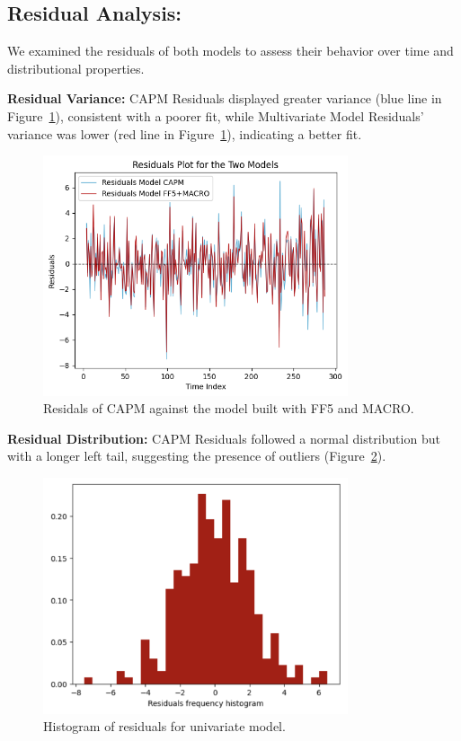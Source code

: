 \subsection{Residual Analysis:}
We examined the residuals of both models to assess their behavior over time and distributional properties.

\textbf{Residual Variance:} CAPM Residuals displayed greater variance (blue line in Figure~\ref{fig:7_5}), consistent with a
poorer fit, while Multivariate Model Residuals' variance was lower (red line in Figure~\ref{fig:7_5}), indicating a better fit.

\begin{figure}[h!]
    \centering
    \includegraphics[width=0.8\textwidth]{images/7_5.png}
    \caption{Residals of CAPM against the model built with FF5  and MACRO.}\label{fig:7_5}
\end{figure}

\textbf{Residual Distribution:} CAPM Residuals followed a normal distribution but with a longer left tail, suggesting the
presence of outliers (Figure~\ref{fig:7_6}).

\begin{figure}[h!]
    \centering
    \includegraphics[width=0.8\textwidth]{images/7_6.png}
    \caption{Histogram of residuals for univariate model.}\label{fig:7_6}
\end{figure}

